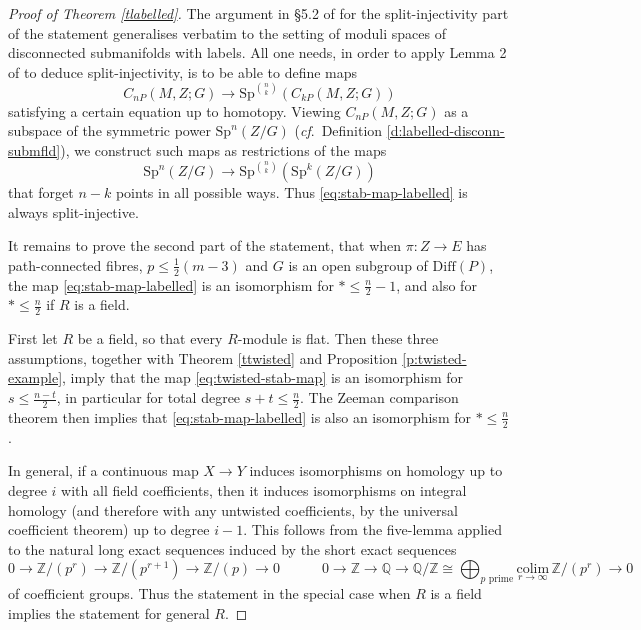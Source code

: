 \documentclass[reqno,a4paper]{article}
\numberwithin{equation}{section}
\theoremstyle{italicised}
\theoremstyle{upright}
\theoremstyle{italicised-restate}
\newcommand{\cf}{\textit{cf}.\ }
\newcommand{\bQ}{\mathbb{Q}}
\newcommand{\bZ}{\mathbb{Z}}
\renewcommand{\leq}{\leqslant}
\begin{document}
\begin{proof}[Proof of Theorem \ref{tlabelled}]
The argument in \S 5.2 of \cite{Palmer2018HomologicalstabilitymoduliI} for the split-injectivity part of the statement generalises verbatim to the setting of moduli spaces of disconnected submanifolds with labels. All one needs, in order to apply Lemma 2 of \cite{Dold1962DecompositiontheoremsSn} to deduce split-injectivity, is to be able to define maps
\[
C_{nP}(M,Z;G) \longrightarrow \mathrm{Sp}^{\binom{n}{k}} (C_{kP}(M,Z;G))
\]
satisfying a certain equation up to homotopy. Viewing $C_{nP}(M,Z;G)$ as a subspace of the symmetric power $\mathrm{Sp}^n(Z/G)$ (\cf Definition \ref{d:labelled-disconn-submfld}), we construct such maps as restrictions of the maps
\[
\mathrm{Sp}^n(Z/G) \longrightarrow \mathrm{Sp}^{\binom{n}{k}} (\mathrm{Sp}^k (Z/G))
\]
that forget $n-k$ points in all possible ways. Thus \eqref{eq:stab-map-labelled} is always split-injective.

It remains to prove the second part of the statement, that when $\pi \colon Z \to E$ has path-connected fibres, $p \leq \tfrac12(m-3)$ and $G$ is an open subgroup of $\mathrm{Diff}(P)$, the map \eqref{eq:stab-map-labelled} is an isomorphism for $* \leq \tfrac{n}{2} - 1$, and also for $* \leq \tfrac{n}{2}$ if $R$ is a field.

First let $R$ be a field, so that every $R$-module is flat. Then these three assumptions, together with Theorem \ref{ttwisted} and Proposition \ref{p:twisted-example}, imply that the map \eqref{eq:twisted-stab-map} is an isomorphism for $s \leq \tfrac{n-t}{2}$, in particular for total degree $s+t \leq \tfrac{n}{2}$. The Zeeman comparison theorem then implies that \eqref{eq:stab-map-labelled} is also an isomorphism for $* \leq \tfrac{n}{2}$.

In general, if a continuous map $X \to Y$ induces isomorphisms on homology up to degree $i$ with all field coefficients, then it induces isomorphisms on integral homology (and therefore with any untwisted coefficients, by the universal coefficient theorem) up to degree $i-1$. This follows from the five-lemma applied to the natural long exact sequences induced by the short exact sequences
\[
0 \to \bZ/(p^r) \to \bZ/(p^{r+1}) \to \bZ/(p) \to 0 \qquad\quad 0 \to \bZ \to \bQ \to \bQ/\bZ \cong\! \bigoplus_{p \text{ prime}} \underset{r \to \infty}{\mathrm{colim}} \, \bZ/(p^r) \to 0
\]
of coefficient groups. Thus the statement in the special case when $R$ is a field implies the statement for general $R$.
\end{proof}




{}
\renewcommand{\bibfont}{\normalfont\small}
\setlength{\bibitemsep}{0pt}
\printbibliography

\vspace{1em}


\end{document}
